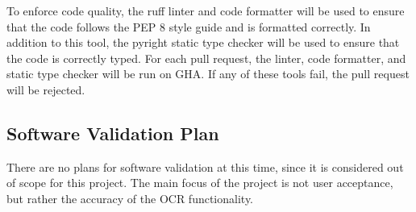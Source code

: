 \documentclass[12pt, titlepage]{article}
\begin{document}
To enforce code quality, the ruff linter and code formatter will be used to
ensure that the code follows the PEP 8 style guide and is formatted correctly.
In addition to this tool, the pyright static type checker will be used to ensure
that the code is correctly typed. For each pull request, the linter, code
formatter, and static type checker will be run on GHA. If any of
these tools fail, the pull request will be rejected.





\subsection{Software Validation Plan}

There are no plans for software validation at this time, since it is considered
out of scope for this project. The main focus of the project is not user
acceptance, but rather the accuracy of the OCR functionality.



\end{document}

